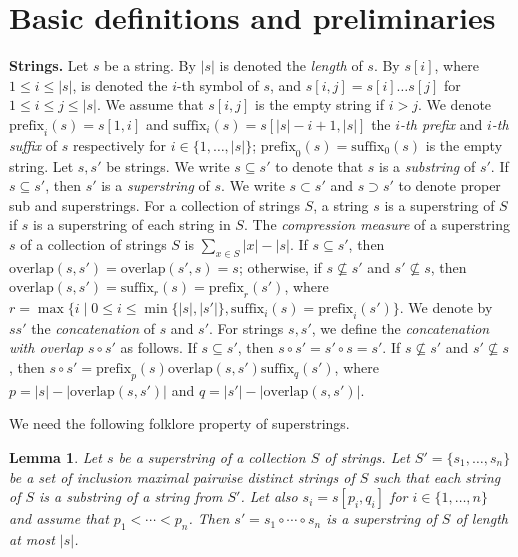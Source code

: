 \documentclass[11pt]{article}
\newtheorem{lemma}{Lemma}
\newcommand{\prefix}{\textrm{prefix}}
\newcommand{\suffix}{\textrm{suffix}}
\newcommand{\overlap}{\textrm{overlap}}
\begin{document}
\section{Basic definitions and preliminaries}\label{sec:defs}
{\bf Strings.} Let $s$ be a string. By $|s|$ is denoted the \emph{length} of $s$. By $s[i]$, where $1\leq i\leq |s|$, is denoted the $i$-th symbol of $s$, and $s[i,j]=s[i]\ldots s[j]$ for $1\leq i\leq j\leq |s|$. We assume that $s[i,j]$ is the empty string if $i>j$.
We denote $\prefix_i(s)=s[1,i]$ and $\suffix_i(s)=s[|s|-i+1,|s|]$  the \emph{$i$-th prefix} and \emph{$i$-th suffix} of $s$ respectively for $i\in\{1,\ldots,|s|\}$;
$\prefix_0(s)=\suffix_0(s)$ is the empty string.
Let $s,s'$ be strings. We write $s\subseteq s'$ to denote that $s$ is a \emph{substring} of $s'$. If $s\subseteq s'$, then $s'$ is a \emph{superstring} of $s$.
We write $s\subset s'$ and $s\supset s'$ to denote proper sub and superstrings.
For a collection of strings $S$, a string $s$ is a superstring of $S$ if $s$ is a superstring of each string in $S$.
The \emph{compression measure} of a superstring $s$ of a collection of strings $S$ is $\sum_{x\in S}|x|-|s|$.
 If $s\subseteq s'$, then $\overlap(s,s')=\overlap(s',s)=s$; otherwise, if $s\not\subseteq s'$ and $s'\not\subseteq s$, then $\overlap(s,s')=\suffix_r(s)=\prefix_r(s')$, where $r=\max\{i\mid 0\leq i\leq\min\{|s|,|s'|\}, \suffix_i(s)=\prefix_i(s')\}$. We denote by $ss'$ the \emph{concatenation} of $s$ and $s'$. 
For strings $s,s'$, we define the \emph{concatenation with overlap} $s\circ s'$ as follows. If $s\subseteq s'$, then $s\circ s'=s'\circ s=s'$. If $s\not\subseteq s'$ and $s'\not\subseteq s$, then $s\circ s'=\prefix_p(s)\overlap(s,s')\suffix_q(s')$, where $p=|s|-|\overlap(s,s')|$ and $q=|s'|-|\overlap(s,s')|$.

We need the following folklore property  of superstrings.

\begin{lemma}\label{lem:overlap}
Let $s$ be a superstring of a collection  $S$ of  strings. 
Let $S'=\{s_1,\ldots,s_n\}$ be a set of inclusion maximal pairwise distinct strings of $S$ such that each string of $S$ is a substring of a string from $S'$.
Let also  $s_i=s[p_i,q_i]$ for $i\in\{1,\ldots,n\}$ and assume that $p_1<\cdots<p_n$.
Then $s'=s_1\circ\cdots\circ s_n$ is a superstring of $S$ of length at most $|s|$. 
\end{lemma}
\end{document}
